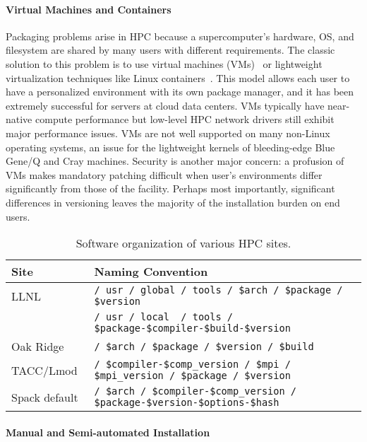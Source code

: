 \paragraph{Virtual Machines and Containers}

Packaging problems arise in HPC because a supercomputer's hardware, OS, and
filesystem are shared by many users with different requirements.  The classic 
solution to this problem is to use virtual
machines (VMs)~\cite{barham2003xen,rosenblum1999vmware,smith2005architecture}
or lightweight virtualization techniques like Linux 
containers~\cite{felter2014updated,merkel2014docker}. This model allows each
 user to have a personalized environment with its own package manager, and it 
has been extremely successful for servers at cloud data centers. VMs typically
have near-native compute performance but low-level HPC network drivers still 
exhibit major performance issues. VMs are not well supported on many
non-Linux operating systems, an issue for the lightweight 
kernels of bleeding-edge Blue Gene/Q and Cray machines. Security
is another major concern: a profusion of VMs makes mandatory patching
difficult when user's environments differ significantly from those of 
the facility. Perhaps most importantly, significant differences in
versioning leaves the majority of the installation burden on end users.

\begin{table*}\centering
\begin{tabular}{|l|l|}
\hline
Site           & Naming Convention \\
\hline
\hline
LLNL       & {\tt / usr / global / tools / \$arch / \$package / \$version} \\
           & {\tt / usr / local~ / tools / \$package-\$compiler-\$build-\$version } \\
\hline
Oak Ridge~\cite{jones+:cug08}  & {\tt / \$arch / \$package / \$version / \$build} \\
\hline
TACC/Lmod~\cite{mclay:lmod-tutorial}& {\tt / \$compiler-\$comp\_version / \$mpi / \$mpi\_version / \$package / \$version} \\
\hline
\hline
Spack default                  & {\tt / \$arch / \$compiler-\$comp\_version / \$package-\$version-\$options-\$hash} \\
\hline
\end{tabular}
\caption{
	Software organization of various HPC sites.
	\label{tab:naming-conventions}
}
\end{table*}

\paragraph{Manual and Semi-automated Installation}


